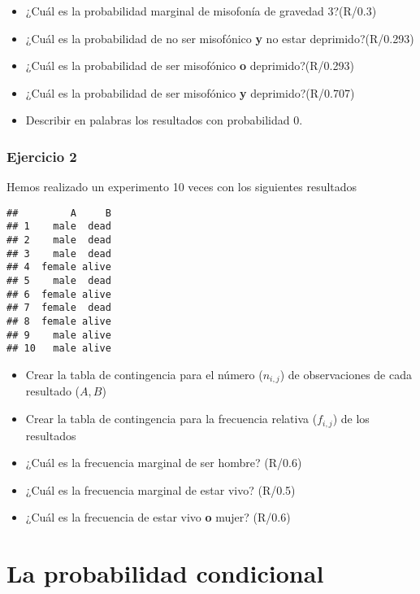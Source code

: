 \documentclass[
]{book}
\providecommand{\tightlist}{%
  \setlength{\itemsep}{0pt}\setlength{\parskip}{0pt}}
\begin{document}
\begin{itemize}
\tightlist
\item
  ¿Cuál es la probabilidad marginal de misofonía de gravedad 3?(R/0.3)
\item
  ¿Cuál es la probabilidad de no ser misofónico \textbf{y} no estar deprimido?(R/0.293)
\item
  ¿Cuál es la probabilidad de ser misofónico \textbf{o} deprimido?(R/0.293)
\item
  ¿Cuál es la probabilidad de ser misofónico \textbf{y} deprimido?(R/0.707)
\item
  Describir en palabras los resultados con probabilidad 0.
\end{itemize}

\hypertarget{ejercicio-2-1}{%
\subsubsection{Ejercicio 2}\label{ejercicio-2-1}}

Hemos realizado un experimento 10 veces con los siguientes resultados

\begin{verbatim}
##         A     B
## 1    male  dead
## 2    male  dead
## 3    male  dead
## 4  female alive
## 5    male  dead
## 6  female alive
## 7  female  dead
## 8  female alive
## 9    male alive
## 10   male alive
\end{verbatim}

\begin{itemize}
\tightlist
\item
  Crear la tabla de contingencia para el número (\(n_{i,j}\)) de observaciones de cada resultado (\(A,B\))
\item
  Crear la tabla de contingencia para la frecuencia relativa (\(f_{i,j}\)) de los resultados
\item
  ¿Cuál es la frecuencia marginal de ser hombre? (R/0.6)
\item
  ¿Cuál es la frecuencia marginal de estar vivo? (R/0.5)
\item
  ¿Cuál es la frecuencia de estar vivo \textbf{o} mujer? (R/0.6)
\end{itemize}

\hypertarget{la-probabilidad-condicional-2}{%
\section{La probabilidad condicional}\label{la-probabilidad-condicional-2}}
\end{document}
